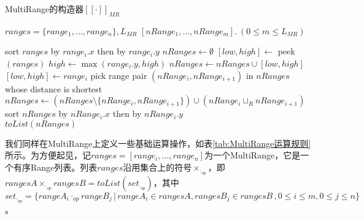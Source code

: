 \begin{breakablealgorithm}
	\caption{MultiRange的构造器$ [[\cdot]]_{MR} $}
	\label{alg:MultiRange}
	\begin{algorithmic}[1]
		
		\Require $ ranges = \{range_1, \dots, range_n\}, L_{MR} $
		\Ensure $ [nRange_1, \dots, nRange_m]. \ (0 \le m \le L_{MR})$
		
		\State sort $ ranges $ by $ range_{i}.x $ then by $ range_{i}.y $
		\State $ nRanges \gets \emptyset$
		\State $ [low, high] \gets$ peek$ (ranges) $
				\State $ high \gets \max(range_i.y, high) $
			\Else
				\State $ nRanges \gets nRanges \cup [low, high] $
				\State $ [low, high] \gets range_i $
			\EndIf
		\EndFor
			\State pick range pair $ (nRange_i, nRange_{i+1} )$ in $ nRanges $ whose distance is shortest
			\State $ nRanges \gets (nRanges \setminus\{nRange_i, nRange_{i+1}\}) \cup (nRange_i \sqcup_R nRange_{i+1}) $
			\State sort $ nRanges $ by $ nRange_{i}.x $ then by $ nRange_{i}.y $
		\EndWhile
		\\\Return $ toList(nRanges) $
		
	\end{algorithmic}
\end{breakablealgorithm}

我们同样在MultiRange上定义一些基础运算操作，如表\ref{tab:MultiRange运算规则}所示。为方便起见，记$ ranges = [range_i, \dots, range_n] $为一个MultiRange，它是一个有序Range列表。列表$ ranges $沿用集合上的符号$ \times_{\cdot_{op}} $，即$ rangesA \times_{\cdot_{op}} rangesB = toList(set_{\cdot_{op}}) $，其中$ set_{\cdot_{op}} = \{rangeA_i \cdot_{op} rangeB_j \, | \, rangeA_i \in rangesA, rangesB_j \in rangesB\, , 0 \le i \le m, 0 \le j \le n\}$。

